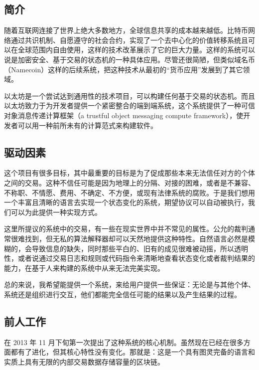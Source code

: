 \documentclass[9pt,oneside]{amsart}
\begin{document}
\setlength{\columnsep}{20pt}
\begin{multicols}{2}

\section{简介}\label{sec:introduction}

随着互联网连接了世界上绝大多数地方，全球信息共享的成本越来越低。比特币网络通过共识机制、自愿遵守的社会合约，实现了一个去中心化的价值转移系统且可以在全球范围内自由使用，这样的技术改革展示了它的巨大力量。这样的系统可以说是加密安全、基于交易的状态机的一种具体应用。尽管还很简陋，但类似域名币（Namecoin）这样的后续系统，把这种技术从最初的“货币应用”发展到了其它领域。

以太坊是一个尝试达到通用性的技术项目，可以构建任何基于交易的状态机。而且以太坊致力于为开发者提供一个紧密整合的端到端系统，这个系统提供了一种可信对象消息传递计算框架（a trustful object messaging compute framework），使开发者可以用一种前所未有的计算范式来构建软件。

\subsection{驱动因素} \label{ch:driving}

这个项目有很多目标，其中最重要的目标是为了促成那些本来无法信任对方的个体之间的交易。这种不信任可能是因为地理上的分隔、对接的困难，或者是不兼容、不称职、不情愿、费用、不确定、不方便，或现有法律系统的腐败。于是我们想用一个丰富且清晰的语言去实现一个状态变化的系统，期望协议可以自动被执行，我们可以为此提供一种实现方式。

这里所提议的系统中的交易，有一些在现实世界中并不常见的属性。公允的裁判通常很难找到，但无私的算法解释器却可以天然地提供这种特性。自然语言必然是模糊的，会导致信息的缺失，同时那些平白的、旧有的成见很难被动摇，所以透明性，或者说通过交易日志和规则或代码指令来清晰地查看状态变化或者裁判结果的能力，在基于人来构建的系统中从来无法完美实现。

总的来说，我希望能提供一个系统，来给用户提供一些保证：无论是与其他个体、系统还是组织进行交互，他们都能完全信任可能的结果以及产生结果的过程。

\subsection{前人工作} \label{ch:previous}

\cite{buterin2013ethereum} 在 2013 年 11 月下旬第一次提出了这种系统的核心机制。虽然现在已经在很多方面都有了进化，但其核心特性没有变化。那就是：这是一个具有图灵完备的语言和实质上具有无限的内部交易数据存储容量的区块链。


\end{multicols}
\end{document}
